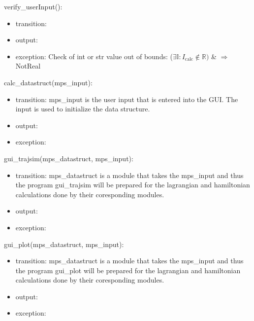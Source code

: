 \documentclass[12pt, titlepage]{article}
\begin{document}
\noindent verify\_userInput():
\begin{itemize}
\item transition:  
\item output:  
\item exception: Check of int or str value out of bounds: 
($\exists \mathbb{I}:I_{\text{calc}} \notin \mathbb{R})$ \& $\Rightarrow$ NotReal\\
\end{itemize}

\noindent calc\_datastruct(mps\_input):
\begin{itemize}
\item transition: mps\_input is the user input that is entered into the GUI. The input is used to initialize the data structure.
\item output:  
\item exception:  
\end{itemize}

\noindent gui\_trajsim(mps\_datastruct, mps\_input):
\begin{itemize}
\item transition: mps\_datastruct is a module that takes the mps\_input and thus the program gui\_trajsim will 
be prepared for the lagrangian and hamiltonian calculations done by their coresponding modules.
\item output:  
\item exception:  
\end{itemize}

\noindent gui\_plot(mps\_datastruct, mps\_input):
\begin{itemize}
\item transition: mps\_datastruct is a module that takes the mps\_input and thus the program gui\_plot will 
be prepared for the lagrangian and hamiltonian calculations done by their coresponding modules.
\item output:  
\item exception:  
\end{itemize}


\end{document}
